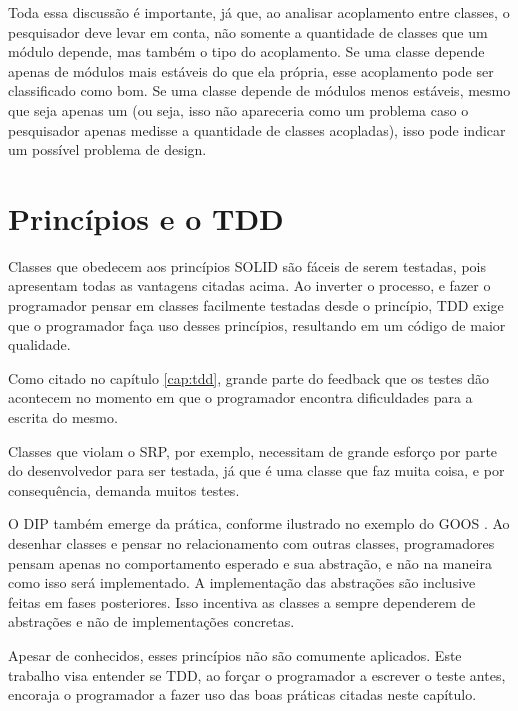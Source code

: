 Toda essa discussão é importante, já que, ao analisar acoplamento entre classes,
o pesquisador deve levar em conta, não somente a quantidade de classes
que um módulo depende, mas também o tipo do acoplamento. Se uma classe depende
apenas de módulos mais estáveis do que ela própria, esse acoplamento pode ser
classificado como bom. Se uma classe depende de módulos menos estáveis, mesmo
que seja apenas um (ou seja, isso não apareceria como um problema caso o
pesquisador apenas medisse a quantidade de classes acopladas), isso pode indicar
um possível problema de design.

\section{Princípios e o TDD}

Classes que obedecem aos princípios SOLID são fáceis de serem testadas, pois
apresentam todas as vantagens citadas acima. Ao inverter o processo, e fazer o
programador pensar em classes facilmente testadas desde o princípio, TDD exige
que o programador faça uso desses princípios, resultando em um código de maior
qualidade.

Como citado no capítulo \ref{cap:tdd}, grande parte do feedback que os testes
dão acontecem no momento em que o programador encontra dificuldades para a
escrita do mesmo.

Classes que violam o SRP, por exemplo, necessitam de grande
esforço por parte do desenvolvedor para ser testada, já que é uma classe que faz
muita coisa, e por consequência, demanda muitos testes.

O DIP também emerge da prática, conforme ilustrado no exemplo do GOOS
\cite{GOOS}. Ao desenhar classes e pensar no relacionamento com outras classes,
programadores pensam apenas no comportamento esperado e sua abstração, e não na
maneira como isso será implementado. A implementação das abstrações são
inclusive feitas em fases posteriores. Isso incentiva as classes a
sempre dependerem de abstrações e não de implementações concretas.

Apesar de conhecidos, esses princípios não são comumente aplicados.
Este trabalho visa entender se TDD, ao forçar o programador a escrever o teste
antes, encoraja o programador a fazer uso das boas práticas citadas neste
capítulo.
